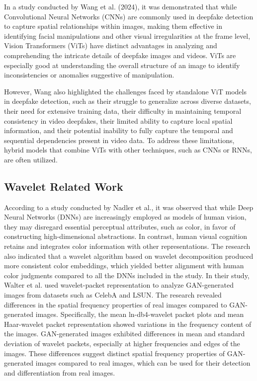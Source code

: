 \documentclass{svproc}
\begin{document}
In a study conducted by Wang et al. (2024), it was demonstrated that while
Convolutional Neural Networks (CNNs) are commonly used in deepfake detection to
capture spatial relationships within images, making them effective in
identifying facial manipulations and other visual irregularities at the frame
level, Vision Transformers (ViTs) have distinct advantages in analyzing and
comprehending the intricate details of deepfake images and videos. ViTs are
especially good at understanding the overall structure of an image to identify
inconsistencies or anomalies suggestive of manipulation.

However, Wang also highlighted the challenges faced by standalone ViT models in
deepfake detection, such as their struggle to generalize across diverse
datasets, their need for extensive training data, their difficulty in
maintaining temporal consistency in video deepfakes, their limited ability to
capture local spatial information, and their potential inability to fully
capture the temporal and sequential dependencies present in video data. To
address these limitations, hybrid models that combine ViTs with other
techniques, such as CNNs or RNNs, are often utilized.

\subsection{Wavelet Related Work}
According to a study conducted by Nadler et al., it was observed that while Deep Neural Networks (DNNs) are increasingly employed as models of human vision, they may disregard essential perceptual attributes, such as color, in favor of constructing high-dimensional abstractions. In contrast, human visual cognition retains and integrates color information with other representations. The research also indicated that a wavelet algorithm based on wavelet decomposition produced more consistent color embeddings, which yielded better alignment with human color judgments compared to all the DNNs included in the study.
In their study, Walter et al. used wavelet-packet representation to analyze GAN-generated images from datasets such as CelebA and LSUN. The research revealed differences in the spatial frequency properties of real images compared to GAN-generated images. Specifically, the mean ln-db4-wavelet packet plots and mean Haar-wavelet packet representation showed variations in the frequency content of the images. GAN-generated images exhibited differences in mean and standard deviation of wavelet packets, especially at higher frequencies and edges of the images. These differences suggest distinct spatial frequency properties of GAN-generated images compared to real images, which can be used for their detection and differentiation from real images.
\end{document}
